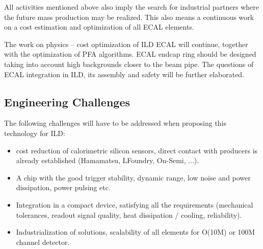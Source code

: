 All activities mentioned above also imply the search for industrial partners
where the future mass production may be realized. This also means a continuous
work on a cost estimation and optimization of all ECAL elements.

The work on physics -- cost optimization of ILD ECAL will continue, together
with the optimization of PFA algorithms. ECAL endcap ring should be designed
taking into account high backgrounds closer to the beam pipe. The questions of
ECAL integration in ILD, its assembly and safety will be further elaborated.

\subsection{Engineering Challenges}
The following challenges will have to be addressed when proposing this
technology for ILD:
\begin{itemize}
\item cost reduction of calorimetric silicon sensors, direct contact
 with producers is already established (Hamamatsu, LFoundry, On-Semi, $\ldots$).
\item A chip with the good trigger stability, dynamic range, low noise and
 power dissipation, power pulsing etc.
\item Integration in a compact device, satisfying all the requirements
 (mechanical tolerances, readout signal quality, heat dissipation / cooling,
 reliability).
\item Industrialization of solutions, scalability of all elements for O(10M)
 or 100M channel detector.
\end{itemize}
